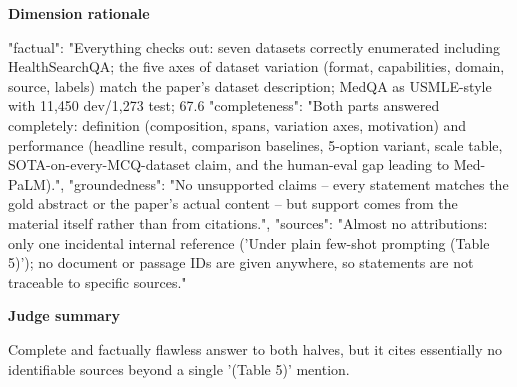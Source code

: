 \documentclass[10pt]{article}
\begin{document}
\textbf{Dimension rationale}
\begin{EvidenceText}
{
  "factual": "Everything checks out: seven datasets correctly enumerated including HealthSearchQA; the five axes of dataset variation (format, capabilities, domain, source, labels) match the paper's dataset description; MedQA as USMLE-style with 11,450 dev/1,273 test; 67.6%
  "completeness": "Both parts answered completely: definition (composition, spans, variation axes, motivation) and performance (headline result, comparison baselines, 5-option variant, scale table, SOTA-on-every-MCQ-dataset claim, and the human-eval gap leading to Med-PaLM).",
  "groundedness": "No unsupported claims -- every statement matches the gold abstract or the paper's actual content -- but support comes from the material itself rather than from citations.",
  "sources": "Almost no attributions: only one incidental internal reference ('Under plain few-shot prompting (Table 5)'); no document or passage IDs are given anywhere, so statements are not traceable to specific sources."
}
\end{EvidenceText}

\textbf{Judge summary}
\begin{EvidenceText}
Complete and factually flawless answer to both halves, but it cites essentially no identifiable sources beyond a single '(Table 5)' mention.
\end{EvidenceText}
\end{document}
